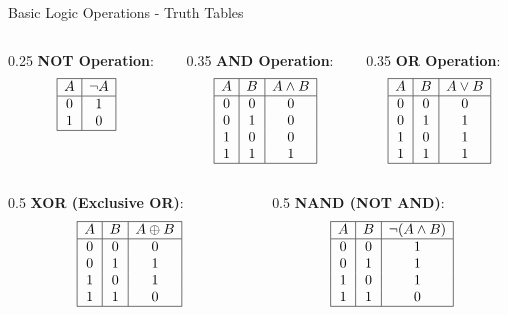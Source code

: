 \documentclass[aspectratio=169,11pt]{beamer}
\newcommand{\concept}[1]{\textbf{\color{accentcolor}#1}}
\begin{document}
\begin{frame}{Basic Logic Operations - Truth Tables}
\begin{columns}
\begin{column}{0.25\textwidth}
\concept{NOT Operation}:
\[
\begin{array}{|c|c|}
\hline
A & \neg A \\
\hline
0 & 1 \\
1 & 0 \\
\hline
\end{array}
\]
\end{column}
\begin{column}{0.35\textwidth}
\concept{AND Operation}:
\[
\begin{array}{|c|c|c|}
\hline
A & B & A \land B \\
\hline
0 & 0 & 0 \\
0 & 1 & 0 \\
1 & 0 & 0 \\
1 & 1 & 1 \\
\hline
\end{array}
\]
\end{column}
\begin{column}{0.35\textwidth}
\concept{OR Operation}:
\[
\begin{array}{|c|c|c|}
\hline
A & B & A \lor B \\
\hline
0 & 0 & 0 \\
0 & 1 & 1 \\
1 & 0 & 1 \\
1 & 1 & 1 \\
\hline
\end{array}
\]
\end{column}
\end{columns}

\vspace{0.5cm}
\begin{columns}
\begin{column}{0.5\textwidth}
\concept{XOR (Exclusive OR)}:
\[
\begin{array}{|c|c|c|}
\hline
A & B & A \oplus B \\
\hline
0 & 0 & 0 \\
0 & 1 & 1 \\
1 & 0 & 1 \\
1 & 1 & 0 \\
\hline
\end{array}
\]
\end{column}
\begin{column}{0.5\textwidth}
\concept{NAND (NOT AND)}:
\[
\begin{array}{|c|c|c|}
\hline
A & B & \neg(A \land B) \\
\hline
0 & 0 & 1 \\
0 & 1 & 1 \\
1 & 0 & 1 \\
1 & 1 & 0 \\
\hline
\end{array}
\]
\end{column}
\end{columns}
\end{frame}
\end{document}
